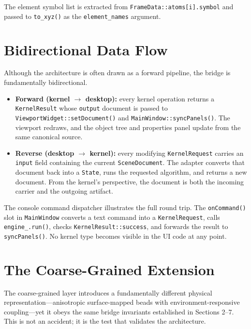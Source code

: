 ﻿\documentclass[11pt]{article}
\newcommand{\type}[1]{\texttt{#1}}
\newcommand{\field}[1]{\texttt{#1}}
\newcommand{\op}[1]{\texttt{#1}}
\begin{document}
The element symbol list is extracted from
\field{FrameData::atoms[i].symbol} and passed to \op{to\_xyz()} as the
\field{element\_names} argument.
\section{Bidirectional Data Flow}

Although the architecture is often drawn as a forward pipeline, the bridge is
fundamentally bidirectional.

\begin{itemize}
  \item \textbf{Forward (kernel $\rightarrow$ desktop):} every kernel
        operation returns a \type{KernelResult} whose \field{output}
        document is passed to \op{ViewportWidget::setDocument()} and
        \op{MainWindow::syncPanels()}. The viewport redraws, and the object
        tree and properties panel update from the same canonical source.

  \item \textbf{Reverse (desktop $\rightarrow$ kernel):} every modifying
        \type{KernelRequest} carries an \field{input} field containing the
        current \type{SceneDocument}. The adapter converts that document back
        into a \type{State}, runs the requested algorithm, and returns a new
        document. From the kernel's perspective, the document is both the
        incoming carrier and the outgoing artifact.
\end{itemize}

The console command dispatcher illustrates the full round trip. The
\op{onCommand()} slot in \type{MainWindow} converts a text command into a
\type{KernelRequest}, calls \op{engine\_.run()}, checks
\type{KernelResult::success}, and forwards the result to
\op{syncPanels()}. No kernel type becomes visible in the UI code at any point.
\section{The Coarse-Grained Extension}
\label{sec:cg}

The coarse-grained layer introduces a fundamentally different physical
representation---anisotropic surface-mapped beads with environment-responsive
coupling---yet it obeys the same bridge invariants established in Sections
2--7. This is not an accident; it is the test that validates the architecture.
\end{document}

